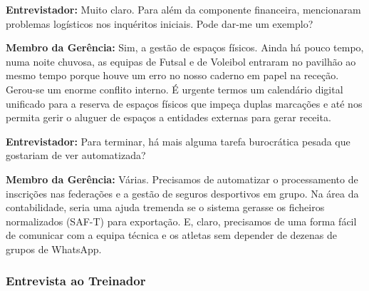 \begin{tcolorbox}[colback=white, colframe=gray!50, arc=1mm, title=\textbf{Transcrição da Entrevista à Gerência}]
\textbf{Entrevistador:} Muito claro. Para além da componente financeira, mencionaram problemas logísticos nos inquéritos iniciais. Pode dar-me um exemplo?

\textbf{Membro da Gerência:} Sim, a gestão de espaços físicos. Ainda há pouco tempo, numa noite chuvosa, as equipas de Futsal e de Voleibol entraram no pavilhão ao mesmo tempo porque houve um erro no nosso caderno em papel na receção. Gerou-se um enorme conflito interno. É urgente termos um calendário digital unificado para a reserva de espaços físicos que impeça duplas marcações e até nos permita gerir o aluguer de espaços a entidades externas para gerar receita.

\textbf{Entrevistador:} Para terminar, há mais alguma tarefa burocrática pesada que gostariam de ver automatizada?

\textbf{Membro da Gerência:} Várias. Precisamos de automatizar o processamento de inscrições nas federações e a gestão de seguros desportivos em grupo. Na área da contabilidade, seria uma ajuda tremenda se o sistema gerasse os ficheiros normalizados (SAF-T) para exportação. E, claro, precisamos de uma forma fácil de comunicar com a equipa técnica e os atletas sem depender de dezenas de grupos de WhatsApp.
\end{tcolorbox}

\clearpage
\subsubsection*{Entrevista ao Treinador}


